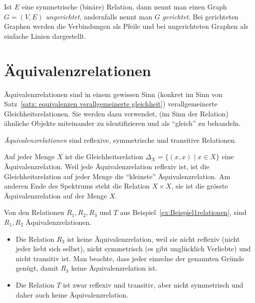 \begin{rk}
    Ist $E$ eine symmetrische (binäre) Relation, dann nennt man einen Graph $G=(V,E)$
    \textit{ungerichtet}, andernfalls nennt man $G$ \textit{gerichtet}. Bei gerichteten
    Graphen werden die Verbindungen als Pfeile und bei ungerichteten Graphen als einfache
    Linien dargestellt.
\end{rk}



\section{Äquivalenzrelationen}

Äquivalenzrelationen sind in einem gewissen Sinn (konkret im Sinn von Satz~\ref{satz: equivalenzen verallgemeinerte gleichheit}) verallgemeinerte Gleichheitsrelationen. Sie werden dazu verwendet, (im Sinn der Relation) ähnliche Objekte miteinander zu identifizieren und als ``gleich'' zu behandeln.

\begin{df}
\textit{Äquivalenzrelationen} sind reflexive, symmetrische und transitive Relationen.
\end{df}

\begin{bsp}
Auf jeder Menge $X$ ist die Gleichheitsrelation $\Delta_X=\{(x,x)\mid x\in X \}$ eine Äquivalenzrelation. Weil jede Äquivalenzrelation reflexiv ist, ist die Gleichheitsrelation auf jeder Menge die ``kleinste'' Äquivalenzrelation. Am anderen Ende des Spektrums steht die Relation $X\times X$, sie ist die grösste Äquivalenzrelation auf der Menge $X$.
\end{bsp}

\begin{bsp}
Von den Relationen $R_1,R_2,R_3$ und $T$ aus Beispiel~\ref{ex:Beispiel1relationen}, sind $R_1,R_2$ Äquivalenzrelationen.
\begin{itemize}
\item Die Relation $R_3$ ist keine Äquivalenzrelation, weil sie nicht reflexiv (nicht jeder liebt sich selbst), nicht symmetrisch (es gibt unglücklich Verliebte) und nicht transitiv ist. Man beachte, dass jeder einzelne der genannten Gründe genügt, damit $R_3$ keine Äquivalenzrelation ist.
\item Die Relation $T$ ist zwar reflexiv und transitiv, aber nicht symmetrisch und daher auch keine Äquivalenzrelation.
\end{itemize}
\end{bsp}


